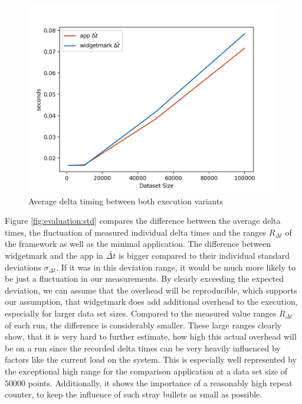 \begin{figure}[h]
    \centering
    \includegraphics[width=12cm]{resources/img/evaluation/Eval_AVG}
    \caption{Average delta timing between both execution variants}
    \label{fig:evaluation:avg}
\end{figure}

Figure \ref{fig:evaluation:std} compares the difference between the average
delta times, the fluctuation of measured individual delta times and the ranges
$R_{\Delta t}$ of the framework as well as the minimal application. The
difference between widgetmark and the app in $\bar{\Delta t}$ is bigger compared
to their individual standard deviations $\sigma_{\Delta t}$. If it was in this
deviation range, it would be much more likely to be just a fluctuation in our
measurements. By clearly exceeding the expected deviation, we can assume that
the overhead will be reproducible, which supports our assumption, that
widgetmark does add additional overhead to the execution, especially for
larger data set sizes. Compared to the measured value ranges $R_{\Delta t}$ of
each run, the difference is considerably smaller. These large ranges clearly
show, that it is very hard to further estimate, how high this actual overhead
will be on a run since the recorded delta times can be very heavily influenced
by factors like the current load on the system. This is especially well
represented by the exceptional high range for the comparison application at
a data set size of $50000$ points. Additionally, it shows the importance of a
reasonably high repeat counter, to keep the influence of such stray bullets as
small as possible.

